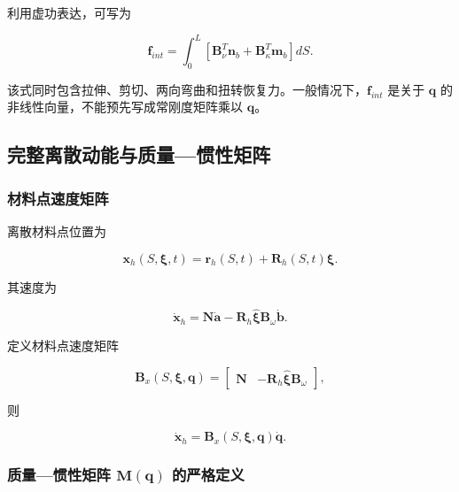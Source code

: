 利用虚功表达，可写为

\begin{equation}
\label{eq:galerkin-2-31}
\mathbf{f}_{int} = \int_{0}^{L}\left\lbrack \mathbf{B}_{\nu}^{T}\mathbf{n}_{b} + \mathbf{B}_{\kappa}^{T}\mathbf{m}_{b} \right\rbrack dS.
\end{equation}

该式同时包含拉伸、剪切、两向弯曲和扭转恢复力。一般情况下，\(\mathbf{f}_{int}\) 是关于 \(\mathbf{q}\) 的非线性向量，不能预先写成常刚度矩阵乘以 \(\mathbf{q}\)。

\subsection{完整离散动能与质量---惯性矩阵}\label{sec:galerkin-2-4}

\subsubsection{材料点速度矩阵}\label{sec:galerkin-2-4-1}

离散材料点位置为

\begin{equation}
\label{eq:galerkin-2-32}
\mathbf{x}_{h}\left( S,\bm{\xi},t \right) = \mathbf{r}_{h}(S,t) + \mathbf{R}_{h}(S,t)\bm{\xi}.
\end{equation}

其速度为

\begin{equation}
\label{eq:galerkin-2-33}
{\dot{\mathbf{x}}}_{h} = \mathbf{N}\dot{\mathbf{a}} - \mathbf{R}_{h}\widehat{\bm{\xi}}\mathbf{B}_{\omega}\dot{\mathbf{b}}.
\end{equation}

定义材料点速度矩阵

\begin{equation}
\label{eq:galerkin-2-34}
\mathbf{B}_{x}\left( S,\bm{\xi},\mathbf{q} \right) = \begin{bmatrix}
\mathbf{N} & - \mathbf{R}_{h}\widehat{\bm{\xi}}\mathbf{B}_{\omega}
\end{bmatrix},
\end{equation}

则

\begin{equation}
\label{eq:galerkin-2-35}
{\dot{\mathbf{x}}}_{h} = \mathbf{B}_{x}\left( S,\bm{\xi},\mathbf{q} \right)\dot{\mathbf{q}}.
\end{equation}

\subsubsection{\texorpdfstring{质量---惯性矩阵 \(\mathbf{M}\left( \mathbf{q} \right)\) 的严格定义}{质量---惯性矩阵 \textbackslash mathbf\{M\}\textbackslash left( \textbackslash mathbf\{q\} \textbackslash right) 的严格定义}}\label{sec:galerkin-2-4-2}

